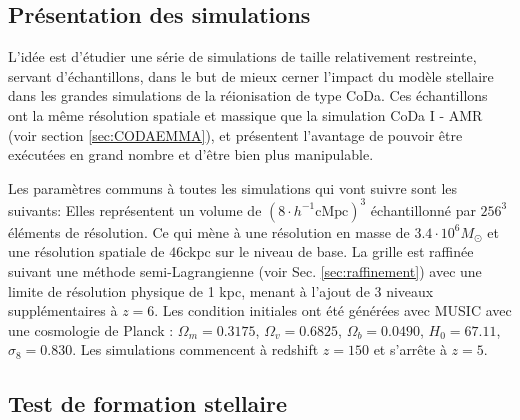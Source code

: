 \subsection{Présentation des simulations}
\label{sec:pres_simu}

L'idée est d'étudier une série de simulations de taille relativement restreinte, servant d'échantillons, dans le but de mieux cerner l'impact du modèle stellaire dans les grandes simulations de la réionisation de type CoDa.
Ces échantillons ont la même résolution spatiale et massique que la simulation CoDa I - AMR (voir section \ref{sec:CODAEMMA}), et présentent l'avantage de pouvoir être exécutées en grand nombre et d'être bien plus manipulable.

Les paramètres communs à toutes les simulations qui vont suivre sont les suivants:
Elles représentent un volume de $\left( 8\cdot h^{-1} \mathrm{cMpc} \right)^3$ échantillonné par $256^3$ éléments de résolution. %
Ce qui mène à une résolution en masse de $3.4 \cdot 10^6 M_\odot$ et une résolution spatiale de $46$ckpc sur le niveau de base.
La grille est raffinée suivant une méthode semi-Lagrangienne (voir Sec. \ref{sec:raffinement}) avec une limite de résolution  physique de 1 kpc, menant à l'ajout de 3 niveaux supplémentaires à $z=6$.
Les condition initiales ont été générées avec MUSIC \citep{hahn_multi-scale_2011} avec une cosmologie de Planck \citep{planck_collaboration_planck_2016} : 
$\Omega_m=0.3175$, 
$\Omega_v=0.6825$,
$\Omega_b=0.0490$,
$H_0=67.11$,
$\sigma_8=0.830$. 
Les simulations commencent à redshift $z=150$ et s’arrête à $z=5$.

\subsection{Test de formation stellaire}

